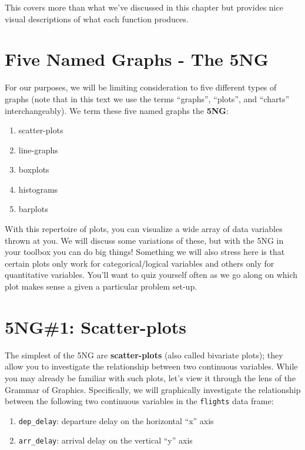 \documentclass[]{tufte-book}
\providecommand{\tightlist}{%
  \setlength{\itemsep}{0pt}\setlength{\parskip}{0pt}}
\begin{document}
This covers more than what we've discussed in this chapter but provides
nice visual descriptions of what each function produces.

\section{Five Named Graphs - The 5NG}\label{five-named-graphs---the-5ng}

For our purposes, we will be limiting consideration to five different
types of graphs (note that in this text we use the terms ``graphs'',
``plots'', and ``charts'' interchangeably). We term these five named
graphs the \textbf{5NG}:

\begin{enumerate}
\def\labelenumi{\arabic{enumi}.}
\tightlist
\item
  scatter-plots
\item
  line-graphs
\item
  boxplots
\item
  histograms
\item
  barplots
\end{enumerate}

With this repertoire of plots, you can visualize a wide array of data
variables thrown at you. We will discuss some variations of these, but
with the 5NG in your toolbox you can do big things! Something we will
also stress here is that certain plots only work for categorical/logical
variables and others only for quantitative variables. You'll want to
quiz yourself often as we go along on which plot makes sense a given a
particular problem set-up.

\section{5NG\#1: Scatter-plots}\label{scatterplots}

The simplest of the 5NG are \textbf{scatter-plots} (also called
bivariate plots); they allow you to investigate the relationship between
two continuous variables. While you may already be familiar with such
plots, let's view it through the lens of the Grammar of Graphics.
Specifically, we will graphically investigate the relationship between
the following two continuous variables in the \texttt{flights} data
frame:

\begin{enumerate}
\def\labelenumi{\arabic{enumi}.}
\tightlist
\item
  \texttt{dep\_delay}: departure delay on the horizontal ``x'' axis
\item
  \texttt{arr\_delay}: arrival delay on the vertical ``y'' axis
\end{enumerate}
\end{document}
